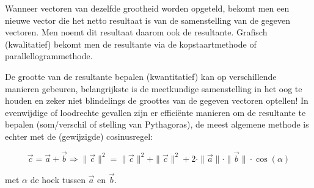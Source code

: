 \documentclass{ximera}
\begin{document}
Wanneer vectoren van dezelfde grootheid worden opgeteld, bekomt men een nieuwe vector die het netto resultaat is van de samenstelling van de gegeven vectoren. 
Men noemt dit resultaat daarom ook de resultante. Grafisch (kwalitatief) bekomt men de resultante via de kopstaartmethode of parallellogrammethode. 

\begin{image}[0.2\textwidth]
\end{image}


De grootte van de resultante bepalen (kwantitatief) kan op verschillende manieren gebeuren, belangrijkste is de meetkundige samenstelling in het oog te houden en zeker niet blindelings de groottes van de gegeven vectoren optellen! 
In evenwijdige of loodrechte gevallen zijn er efficiënte manieren om de resultante te bepalen (som/verschil of stelling van Pythagoras), de meest algemene methode is echter met de (gewijzigde) cosinusregel:

\[
\vec{c} = \vec{a} + \vec{b} \Rightarrow \| \vec{c} \|^2 = \| \vec{c} \|^2 + \| \vec{c} \|^2 + 2 \cdot \|\vec{a}\| \cdot \|\vec{b}\| \cdot \cos(\alpha)
\]

met \(\alpha\) de hoek tussen \(\vec{a}\) en \(\vec{b}\). 
\end{document}
